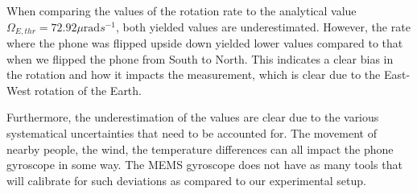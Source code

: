 \documentclass[a4paper]{article}
\begin{document}
When comparing the values of the rotation rate to the analytical value $\Omega_{E, thr} = 72.92\mu \text{rad}s^{-1}$, 
both yielded values are underestimated. However, the rate where the phone was flipped upside down yielded lower values
compared to that when we flipped the phone from South to North. This indicates a clear bias in the rotation and how it 
impacts the measurement, which is clear due to the East-West rotation of the Earth. \par 

Furthermore, the underestimation of the values are clear due to the various systematical uncertainties that need to be accounted for.
The movement of nearby people, the wind, the temperature differences can all impact the phone gyroscope in some way. The 
MEMS gyroscope does not have as many tools that will calibrate for such deviations as compared to our experimental setup. 
\end{document}
